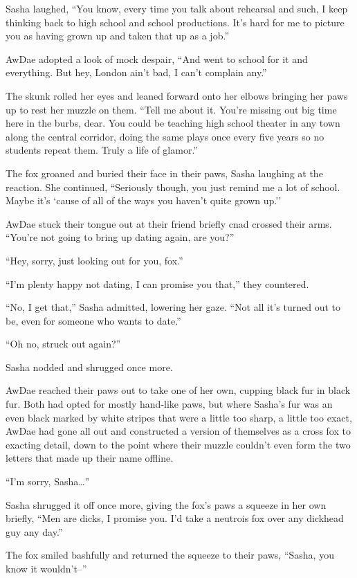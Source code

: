 Sasha laughed, ``You know, every time you talk about rehearsal and such, I keep thinking back to high school and school productions.  It's hard for me to picture you as having grown up and taken that up as a job.''

AwDae adopted a look of mock despair, ``And went to school for it and everything.  But hey, London ain't bad, I can't complain any.''

The skunk rolled her eyes and leaned forward onto her elbows bringing her paws up to rest her muzzle on them.  ``Tell me about it.  You're missing out big time here in the burbs, dear.  You could be teaching high school theater in any town along the central corridor, doing the same plays once every five years so no students repeat them.  Truly a life of glamor.''

The fox groaned and buried their face in their paws, Sasha laughing at the reaction.  She continued, ``Seriously though, you just remind me a lot of school.  Maybe it's `cause of all of the ways you haven't quite grown up.''

AwDae stuck their tongue out at their friend briefly cnad crossed their arms. ``You're not going to bring up dating again, are you?''

``Hey, sorry, just looking out for you, fox.''

``I'm plenty happy not dating, I can promise you that,'' they countered.

``No, I get that,'' Sasha admitted, lowering her gaze.  ``Not all it's turned out to be, even for someone who wants to date.''

``Oh no, struck out again?''

Sasha nodded and shrugged once more.

AwDae reached their paws out to take one of her own, cupping black fur in black fur.  Both had opted for mostly hand-like paws, but where Sasha's fur was an even black marked by white stripes that were a little too sharp, a little too exact, AwDae had gone all out and constructed a version of themselves as a cross fox to exacting detail, down to the point where their muzzle couldn't even form the two letters that made up their name offline.

``I'm sorry, Sasha\ldots{}''

Sasha shrugged it off once more, giving the fox's paws a squeeze in her own briefly, ``Men are dicks, I promise you.  I'd take a neutrois fox over any dickhead guy any day.''

The fox smiled bashfully and returned the squeeze to their paws, ``Sasha, you know it wouldn't--''

